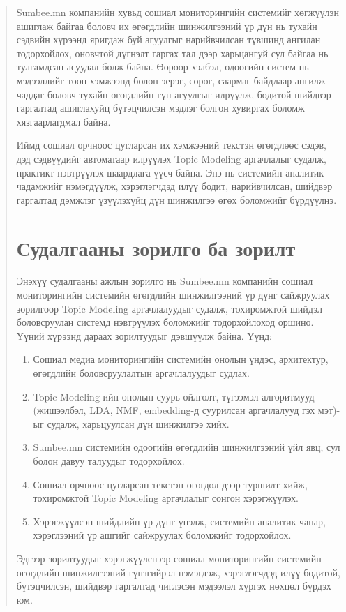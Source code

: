 \begin{abstract}
Sumbee.mn компанийн хувьд сошиал мониторингийн системийг хөгжүүлэн ашиглаж байгаа боловч их өгөгдлийн шинжилгээний үр дүн нь тухайн сэдвийн хүрээнд яригдаж буй агуулгыг нарийвчилсан түвшинд ангилан тодорхойлох, оновчтой дүгнэлт гаргах тал дээр харьцангуй сул байгаа нь тулгамдсан асуудал болж байна. Өөрөөр хэлбэл, одоогийн систем нь мэдээллийг тоон хэмжээнд болон эерэг, сөрөг, саармаг байдлаар ангилж чаддаг боловч тухайн өгөгдлийн гүн агуулгыг илрүүлж, бодитой шийдвэр гаргалтад ашиглахуйц бүтэцчилсэн мэдлэг болгон хувиргах боломж хязгаарлагдмал байна.

Иймд сошиал орчноос цугларсан их хэмжээний текстэн өгөгдлөөс сэдэв, дэд сэдвүүдийг автоматаар илрүүлэх Topic Modeling аргачлалыг судалж, практикт нэвтрүүлэх шаардлага үүсч байна. Энэ нь системийн аналитик чадамжийг нэмэгдүүлж, хэрэглэгчдэд илүү бодит, нарийвчилсан, шийдвэр гаргалтад дэмжлэг үзүүлэхүйц дүн шинжилгээ өгөх боломжийг бүрдүүлнэ.
\section{Судалгааны зорилго ба зорилт}
Энэхүү судалгааны ажлын зорилго нь Sumbee.mn компанийн сошиал мониторингийн системийн өгөгдлийн шинжилгээний үр дүнг сайжруулах зорилгоор Topic Modeling аргачлалуудыг судалж, тохиромжтой шийдэл боловсруулан системд нэвтрүүлэх боломжийг тодорхойлоход оршино. Үүний хүрээнд дараах зорилтуудыг дэвшүүлж байна. Үүнд:
\begin{enumerate}
    \item Сошиал медиа мониторингийн системийн онолын үндэс, архитектур, өгөгдлийн боловсруулалтын аргачлалуудыг судлах.
    \item Topic Modeling-ийн онолын суурь ойлголт, түгээмэл алгоритмууд (жишээлбэл, LDA, NMF, embedding-д суурилсан аргачлалууд гэх мэт)-ыг судалж, харьцуулсан дүн шинжилгээ хийх.
    \item Sumbee.mn системийн одоогийн өгөгдлийн шинжилгээний үйл явц, сул болон давуу талуудыг тодорхойлох.
    \item Сошиал орчноос цугларсан текстэн өгөгдөл дээр туршилт хийж, тохиромжтой Topic Modeling аргачлалыг сонгон хэрэгжүүлэх.
    \item Хэрэгжүүлсэн шийдлийн үр дүнг үнэлж, системийн аналитик чанар, хэрэглээний үр ашгийг сайжруулах боломжийг тодорхойлох.
\end{enumerate}
Эдгээр зорилтуудыг хэрэгжүүлснээр сошиал мониторингийн системийн өгөгдлийн шинжилгээний гүнзгийрэл нэмэгдэж, хэрэглэгчдэд илүү бодитой, бүтэцчилсэн, шийдвэр гаргалтад чиглэсэн мэдээлэл хүргэх нөхцөл бүрдэх юм.

\end{abstract}
